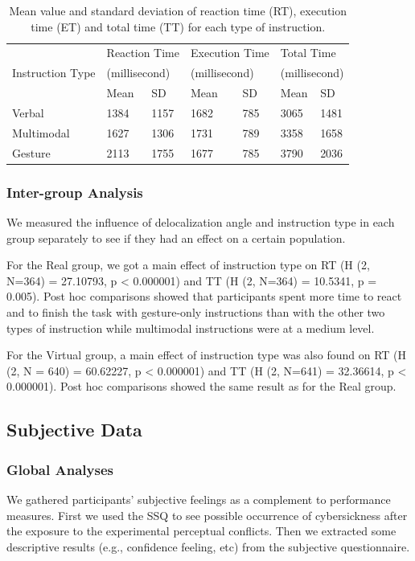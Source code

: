 \begin{table}[!t]
\renewcommand{\arraystretch}{1.3}
\caption{Mean value and standard deviation of reaction time (RT), execution time (ET) and total time (TT) for each type of instruction.}
\label{tab:3_metrics}
\centering
\begin{tabular}{l l l l l l l}
  \hline
    & \multicolumn{2}{p{3cm}}{Reaction Time} & \multicolumn{2}{p{3cm}}{Execution Time} & \multicolumn{2}{p{3cm}}{Total Time} \\
    Instruction Type & \multicolumn{2}{p{3cm}}{(millisecond)} & \multicolumn{2}{p{3cm}}{(millisecond)} & \multicolumn{2}{p{3cm}}{(millisecond)} \\
    \hline
    & Mean & SD & Mean & SD & Mean & SD \\
    Verbal & 1384 & 1157 & 1682 & 785 & 3065 & 1481 \\
  Multimodal & 1627 & 1306 & 1731 & 789 & 3358 & 1658 \\
  Gesture & 2113 & 1755 & 1677 & 785 & 3790 & 2036 \\ \hline
\end{tabular}
\end{table}

\subsubsection{Inter-group Analysis}
We measured the influence of delocalization angle and instruction type in each group separately to see if they had an effect on a certain population.

For the Real group, we got a main effect of instruction type on RT (H (2, N=364) = 27.10793, p \textless{} 0.000001) and TT (H (2, N=364) = 10.5341, p = 0.005). Post hoc comparisons showed that participants spent more time to react and to finish the task with gesture-only instructions than with the other two types of instruction while multimodal instructions were at a medium level.

For the Virtual group, a main effect of instruction type was also found on RT (H (2, N = 640) = 60.62227, p \textless{} 0.000001) and TT (H (2, N=641) = 32.36614, p \textless{} 0.000001). Post hoc comparisons showed the same result as for the Real group.

\subsection{Subjective Data}
\subsubsection{Global Analyses}
We gathered participants' subjective feelings as a complement to performance measures. First we used the SSQ to see possible occurrence of cybersickness after the exposure to the experimental perceptual conflicts. Then we extracted some descriptive results (e.g., confidence feeling, etc) from the subjective questionnaire.

